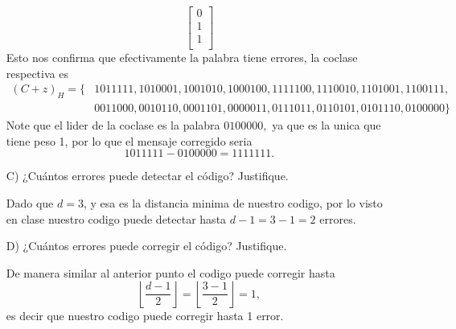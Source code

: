 \begin{itemize}
\begin{sols}
$$\begin{bmatrix}
        0\\
        1\\
        1\\
    \end{bmatrix}$$
    Esto nos confirma que efectivamente la palabra tiene errores, la coclase respectiva es
    \begin{align*}
        (C+z)_H=\{&1011111,1010001,1001010,1000100,1111100,1110010,1101001,1100111,\\&0011000,0010110,0001101,0000011,0111011,0110101,0101110,0100000\}
    \end{align*}
    Note que el lider de la coclase es la palabra $0100000,$ ya que es la unica que tiene peso 1, por lo que el mensaje corregido seria 
    $$1011111-0100000=1111111.$$
    \end{sols}
    
    \item[C)]¿Cuántos errores puede detectar el código? Justifique.
    \begin{sols}
      Dado que $d=3$, y esa es la distancia minima de nuestro codigo, por lo visto en clase nuestro codigo puede detectar hasta $d-1=3-1=2$ errores.  

    \end{sols}
    \item[D)]¿Cuántos errores puede corregir el código? Justifique.
    \begin{sols}
        De manera similar al anterior punto el codigo puede corregir hasta
        $$\left\lfloor\frac{d-1}{2}\right\rfloor=\left\lfloor\frac{3-1}{2}\right\rfloor=1,$$
        es decir que nuestro codigo puede corregir hasta 1 error.
    \end{sols}
\end{itemize}